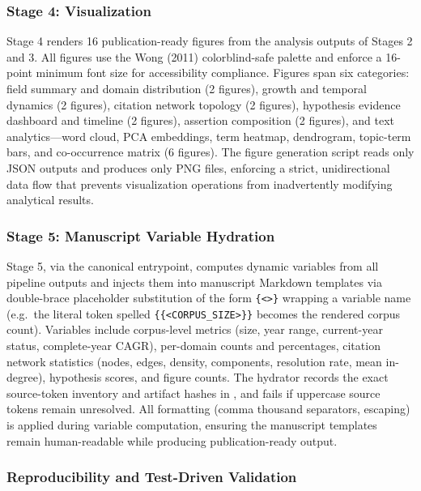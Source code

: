 \documentclass[
  english,
]{article}
\begin{document}
\subsubsection{Stage 4: Visualization}\label{stage-4-visualization}

Stage 4 renders 16 publication-ready figures from the analysis outputs
of Stages 2 and 3. All figures use the Wong (2011) colorblind-safe
palette \citep{wong2011colorblind} and enforce a 16-point minimum font
size for accessibility compliance. Figures span six categories: field
summary and domain distribution (2 figures), growth and temporal
dynamics (2 figures), citation network topology (2 figures), hypothesis
evidence dashboard and timeline (2 figures), assertion composition (2
figures), and text analytics---word cloud, PCA embeddings, term heatmap,
dendrogram, topic-term bars, and co-occurrence matrix (6 figures). The
figure generation script reads only JSON outputs and produces only PNG
files, enforcing a strict, unidirectional data flow that prevents
visualization operations from inadvertently modifying analytical
results.

\subsubsection{Stage 5: Manuscript Variable
Hydration}\label{stage-5-manuscript-variable-hydration}

Stage 5, via the canonical
 entrypoint,
computes dynamic variables from all pipeline outputs and injects them
into manuscript Markdown templates via double-brace placeholder
substitution of the form \texttt{\{\textless{}\textgreater{}\}} wrapping
a variable name (e.g.~the literal token spelled
\texttt{\{\{\textless{}CORPUS\_SIZE\textgreater{}\}\}} becomes the
rendered corpus count). Variables include corpus-level metrics (size,
year range, current-year status, complete-year CAGR), per-domain counts
and percentages, citation network statistics (nodes, edges, density,
components, resolution rate, mean in-degree), hypothesis scores, and
figure counts. The hydrator records the exact source-token inventory and
artifact hashes in , and
fails if uppercase source tokens remain unresolved. All formatting
(comma thousand separators, escaping) is applied during variable
computation, ensuring the manuscript templates remain human-readable
while producing publication-ready output.

\subsubsection{Reproducibility and Test-Driven
Validation}\label{reproducibility-and-test-driven-validation}
\end{document}
